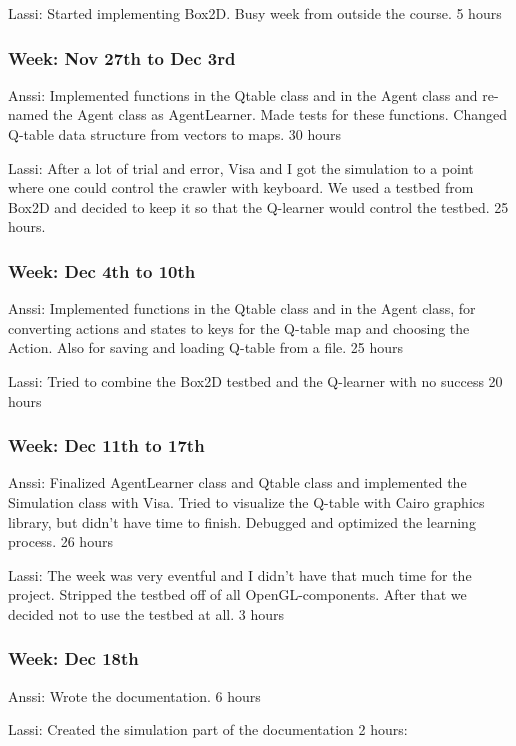\documentclass{article}
\begin{document}
Lassi:
Started implementing Box2D. Busy week from outside the course.
5 hours

\subsubsection{Week: Nov 27th to Dec 3rd}
Anssi:
Implemented functions in the Qtable class and in the Agent class and
re-named the Agent class as AgentLearner. Made tests for these functions.
Changed Q-table data structure from vectors to maps.
30 hours

Lassi:
After a lot of trial and error, Visa and I got the simulation to a point 
where one could control the crawler with keyboard. We used a testbed from 
Box2D and decided to keep it so that the Q-learner would control the testbed.
25 hours.

\subsubsection{Week: Dec 4th to 10th}
Anssi:
Implemented functions in the Qtable class and in the Agent class, for
converting actions and states to keys for the Q-table map and choosing
the Action. Also for saving and loading Q-table from a file.
25 hours

Lassi: Tried to combine the Box2D testbed and the Q-learner with no success
20 hours

\subsubsection{Week: Dec 11th to 17th}
Anssi:
Finalized AgentLearner class and Qtable class and implemented the
Simulation class with Visa. Tried to visualize the Q-table with
Cairo graphics library, but didn’t have time to finish. Debugged
and optimized  the learning process.
26 hours

Lassi:
The week was very eventful and I didn't have that much time for the project.
Stripped the testbed off of all OpenGL-components. After that we decided not
to use the testbed at all.
3 hours

\subsubsection{Week: Dec 18th}
Anssi:
Wrote the documentation.
6 hours

Lassi:
Created the simulation part of the documentation
2 hours:
\end{document}
